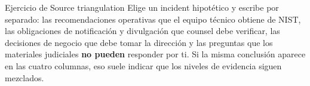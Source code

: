 \documentclass[a4paper]{article}
\begin{document}
\begin{importantbox}{Ejercicio de Source triangulation}
Elige un incident hipotético y escribe por separado: las recomendaciones operativas que el equipo técnico obtiene de NIST, las obligaciones de notificación y divulgación que counsel debe verificar, las decisiones de negocio que debe tomar la dirección y las preguntas que los materiales judiciales \textbf{no pueden} responder por ti. Si la misma conclusión aparece en las cuatro columnas, eso suele indicar que los niveles de evidencia siguen mezclados.
\end{importantbox}
\end{document}
